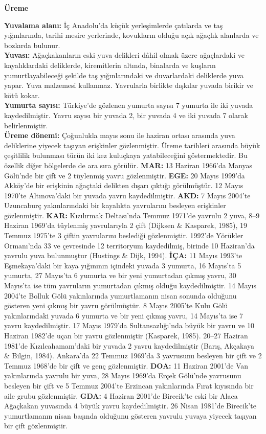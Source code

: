 \documentclass[
  10.5pt,
  a4paper,
  DIV=11,
  numbers=noendperiod,
  twocolumn]{scrreprt}
\begin{document}
\textbf{Üreme}

\textbf{Yuvalama alanı:} İç Anadolu'da küçük yerleşimlerde çatılarda ve
taş yığınlarında, tarihi mesire yerlerinde, kovukların olduğu açık
ağaçlık alanlarda ve bozkırda bulunur.\\
\textbf{Yuvası:} Ağaçkakanların eski yuva delikleri dâhil olmak üzere
ağaçlardaki ve kayalıklardaki deliklerde, kiremitlerin altında,
binalarda ve kuşların yumurtlayabileceği şekilde taş yığınlarındaki ve
duvarlardaki deliklerde yuva yapar. Yuva malzemesi kullanmaz. Yavrularla
birlikte dışkılar yuvada birikir ve kötü kokar.\\
\textbf{Yumurta sayısı:} Türkiye'de gözlenen yumurta sayısı 7 yumurta
ile iki yuvada kaydedilmiştir. Yavru sayısı bir yuvada 2, bir yuvada 4
ve iki yuvada 7 olarak belirlenmiştir.\\
\textbf{Üreme dönemi:} Çoğunlukla mayıs sonu ile haziran ortası arasında
yuva deliklerine yiyecek taşıyan erişkinler gözlenmiştir. Üreme
tarihleri arasında büyük çeşitlilik bulunması türün iki kez kuluçkaya
yatabileceğini göstermektedir. Bu özellik diğer bölgelerde de ara sıra
görülür. \textbf{MAR:} 13 Haziran 1966'da Manyas Gölü'nde bir çift ve 2
tüylenmiş yavru gözlenmiştir. \textbf{EGE:} 20 Mayıs 1999'da Akköy'de
bir erişkinin ağaçtaki delikten dışarı çıktığı görülmüştür. 12 Mayıs
1970'te Altınova'daki bir yuvada yavru kaydedilmiştir. \textbf{AKD:} 7
Mayıs 2004'te Uzuncaburç yakınlarındaki bir kayalıkta yavrularını
besleyen erişkinler gözlenmiştir. \textbf{KAR:} Kızılırmak Deltası'nda
Temmuz 1971'de yavrulu 2 yuva, 8--9 Haziran 1969'da tüylenmiş
yavrularıyla 2 çift (Dijksen \& Kasparek, 1985), 19 Temmuz 1975'te 3
çiftin yavrularını beslediği gözlenmiştir. 1992'de Yörükler Ormanı'nda
33 ve çevresinde 12 territoryum kaydedilmiş, birinde 10 Haziran'da
yavrulu yuva bulunmuştur (Hustings \& Dijk, 1994). \textbf{İÇA:} 11
Mayıs 1993'te Eşmekaya'daki bir kaya yığınının içindeki yuvada 3
yumurta, 16 Mayıs'ta 5 yumurta, 27 Mayıs'ta 6 yumurta ve bir yeni
yumurtadan çıkmış yavru, 30 Mayıs'ta ise tüm yavruların yumurtadan
çıkmış olduğu kaydedilmiştir. 14 Mayıs 2004'te Bolluk Gölü yakınlarında
yumurtlamanın nisan sonunda olduğunu gösteren yeni çıkmış bir yavru
görülmüştür. 8 Mayıs 2005'te Kulu Gölü yakınlarındaki yuvada 6 yumurta
ve bir yeni çıkmış yavru, 14 Mayıs'ta ise 7 yavru kaydedilmiştir. 17
Mayıs 1979'da Sultansazlığı'nda büyük bir yavru ve 10 Haziran 1982'de
uçan bir yavru gözlenmiştir (Kasparek, 1985). 20--27 Haziran 1981'de
Kızılcahamam'daki bir yuvada 2 yavru kaydedilmiştir (Barış, Akçakaya \&
Bilgin, 1984). Ankara'da 22 Temmuz 1969'da 3 yavrusunu besleyen bir çift
ve 2 Temmuz 1968'de bir çift ve genç gözlenmiştir. \textbf{DOA:} 11
Haziran 2001'de Van yakınlarında yavrulu bir yuva, 28 Mayıs 1969'da
Erçek Gölü'nde yavrusunu besleyen bir çift ve 5 Temmuz 2004'te Erzincan
yakınlarında Fırat kıyısında bir aile grubu gözlenmiştir. \textbf{GDA:}
4 Haziran 2001'de Birecik'te eski bir Alaca Ağaçkakan yuvasında 4 büyük
yavru kaydedilmiştir. 26 Nisan 1981'de Birecik'te yumurtlamanın nisan
başında olduğunu gösteren yavrulu yuvaya yiyecek taşıyan bir çift
gözlenmiştir.
\end{document}
